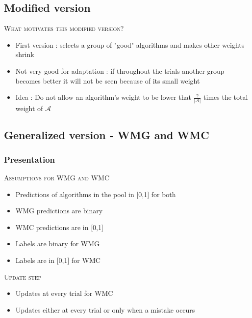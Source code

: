 \documentclass{beamer}
\begin{document}
		\subsection{Modified version}

\begin{frame}

\textsc{What motivates this modified version?}  \newline
\begin{itemize}
\item First version :  selects a group of "good" algorithms and makes other weights shrink
\item Not very good for adaptation : if throughout the trials another group becomes better it will not be seen because of its small weight
\item Idea : Do not allow an algorithm's weight to be lower that $\frac{\gamma}{\lvert\mathcal{A}\rvert}$ times the total weight of $\mathcal{A}$
\end{itemize}
\end{frame}
		
		\subsection{Generalized version - WMG and WMC}
			\subsubsection*{Presentation}
\begin{frame}

\textsc{Assumptions for WMG and WMC} 
\begin{itemize}
\item Predictions of algorithms in the pool in [0,1] for both
\item WMG predictions are binary
\item WMC predictions are in [0,1]
\item Labels are binary for WMG
\item Labels are in [0,1] for WMC \newline
\end{itemize}

\textsc{Update step} 
\begin{itemize}
\item Updates at every trial for WMC
\item Updates either at every trial or only when a mistake occurs
\end{itemize}

\end{frame}	
\end{document}
